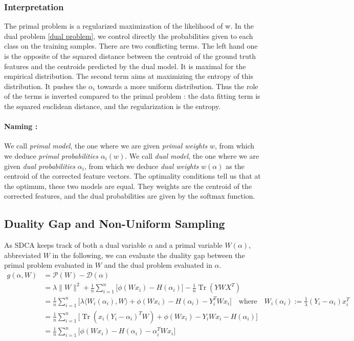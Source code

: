 \documentclass{article}
\DeclareMathOperator{\Tr}{Tr}
\DeclareMathOperator{\1}{\mathbb{1}}
\begin{document}
\subsubsection{Interpretation}
The primal problem is a regularized maximization of the likelihood of w. 
In the dual problem \ref{dual problem}, we control directly the probabilities given to each class on the training samples.
There are two conflicting terms.
The left hand one is the opposite of the squared distance between the centroid of the ground truth features and the centroids predicted by the dual model. It is maximal for the empirical distribution.
The second term aims at maximizing the entropy of this distribution.
It pushes the $\alpha_i$ towards a more uniform distribution.
Thus the role of the terms is inverted compared to the primal problem : the data fitting term is the squared euclidean distance, and the regularization is the entropy.

\paragraph{Naming :} 
We call \textit{primal model}, the one where we are given \textit{primal weights} $w$, from which we deduce \textit{primal probabilities} $\alpha_i(w)$.
We call \textit{dual model}, the one where we are given \textit{dual probabilities} $\alpha_i$, from which we deduce \textit{dual weights} $w(\alpha)$ as the centroid of the corrected feature vectors.
The optimality conditions tell us that at the optimum, these two models are equal.
They weights are the centroid of the corrected features, and the dual probabilities are given by the softmax function.


\subsection{Duality Gap and Non-Uniform Sampling}
As SDCA keeps track of both a dual variable $\alpha$ and a primal variable $W(\alpha)$, abbreviated $W$ in the following, we can evaluate the duality gap between the primal problem evaluated in $W$ and the dual problem evaluated in $\alpha$. 
\begin{align*}
	g(\alpha,W) & = \mathscr{P}(W) - \mathscr{D}(\alpha)\\
	& = \lambda \|W\|^2 	+\frac{1}{n}\sum_{i=1}^n \big[ \phi(Wx_i) - H(\alpha_i)\big] - \frac{1}{n}\Tr(Y W X^T) \\
	& = \frac{1}{n}\sum_{i=1}^n \big[ \lambda \langle W_i(\alpha_i),W\rangle + \phi(Wx_i) - H(\alpha_i) - Y_i^T W x_i\big] \quad \textrm{where} \quad W_i(\alpha_i) := \frac{1}{\lambda} (Y_i - \alpha_i) x_i^T \\
	& = \frac{1}{n}\sum_{i=1}^n \big[ \Tr(x_i (Y_i-\alpha_i)^T W) + \phi(Wx_i) - Y_i W x_i - H(\alpha_i)\big]\\
	& = \frac{1}{n}\sum_{i=1}^n \big[\phi(Wx_i) - H(\alpha_i) - \alpha_i^T W x_i\big]
\end{align*}
\end{document}
